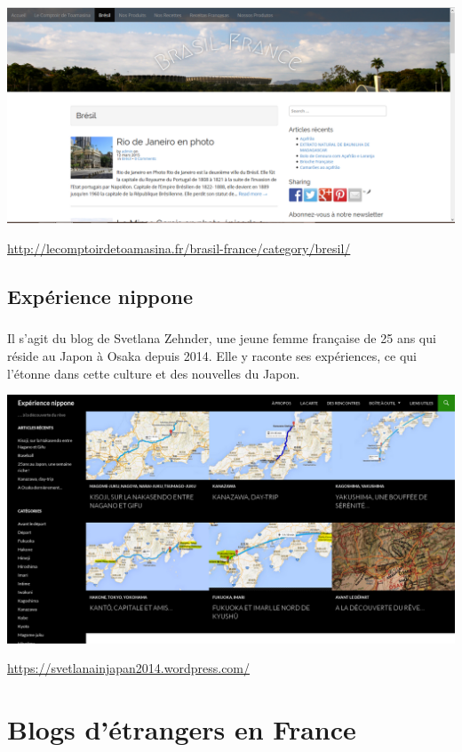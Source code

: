 \begin{center}
	\includegraphics[scale=0.25]{Toamasina.png}
\end{center}
\url{http://lecomptoirdetoamasina.fr/brasil-france/category/bresil/}

\section{Expérience nippone}

\paragraph{} Il s'agit du blog de Svetlana Zehnder, une jeune femme française
de 25 ans qui réside au Japon à Osaka depuis 2014. Elle y raconte ses
expériences, ce qui l'étonne dans cette culture et des nouvelles du Japon.

\begin{center}
	\includegraphics[scale=0.25]{Svetlana.png}
\end{center}
\url{https://svetlanainjapan2014.wordpress.com/}

\chapter[Étrangers en France]{Blogs d'étrangers en France}

